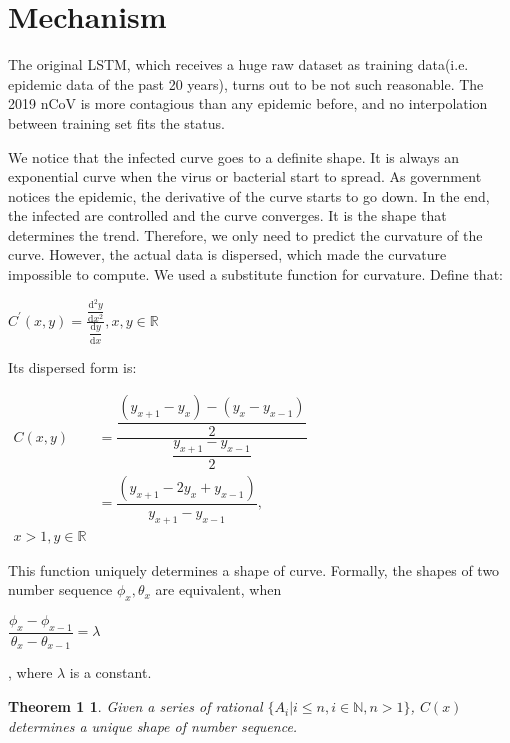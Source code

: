 \documentclass[]{article}
\begin{document}
\section{Mechanism}
\par
The original LSTM, which receives a huge raw dataset as training data(i.e. epidemic data of the past 20 years), turns out to be not such reasonable. The 2019 nCoV is more contagious than any epidemic before, and no interpolation between training set fits the status.
\par
We notice that the infected curve goes to a definite shape. It is always an exponential curve when the virus or bacterial start to spread. As government notices the epidemic, the derivative of the curve starts to go down. In the end, the infected are controlled and the curve converges. It is the shape that determines the trend. Therefore, we only need to predict the curvature of the curve. However, the actual data is dispersed, which made the curvature impossible to compute. We used a substitute function for curvature. Define that:
\begin{center}
	\begin{math}
	C^{\prime}(x, y) = \tfrac{ \dfrac{\mathrm{d}^2 y}{\mathrm{d}x^2} } { \dfrac{\mathrm{d} y}{\mathrm{d}x} }
	, x, y\in \mathbb{R}
	\end{math}
\end{center}
Its dispersed form is:
\begin{center}
	\begin{math}
		\begin{aligned}
	C(x, y) &= \dfrac{ \dfrac{(y_{x+1} - y_{x}) - (y_{x} - y_{x-1}) }{2} } { \dfrac{y_{x+1} - y_{x-1}}{2} }
	\\
	&=\dfrac{ (y_{x+1} - 2y_{x} + y_{x-1}) } { y_{x+1} - y_{x-1} }
	,\\ x > 1, y \in \mathbb{R}
		\end{aligned}
	\end{math}
\end{center}
This function uniquely determines a shape of curve. Formally, the shapes of two number sequence $\phi_x, \theta_x$ are equivalent, when
\begin{center}
	\begin{math}
	\dfrac{\phi_x - \phi_{x-1}}{\theta_x - \theta_{x-1}} = \lambda
	\end{math}
\end{center}
, where $\lambda$ is a constant.
\newtheorem*{Theorem Unique}{Theorem 1}
\begin{Theorem Unique}
Given a series of rational $\{ A_i | i \leq n, i \in \mathbb{N}, n > 1 \}$, $C(x)$ determines a unique shape of number sequence.
\end{Theorem Unique}
\end{document}

